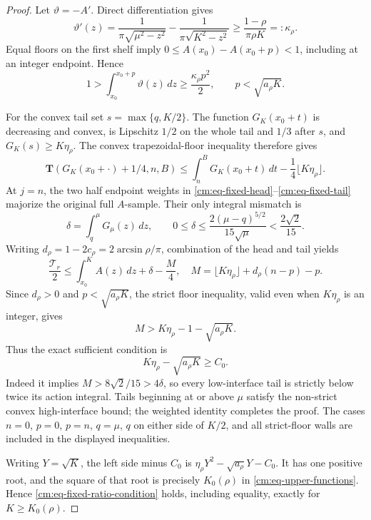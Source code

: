 \documentclass[11pt]{article}
\numberwithin{equation}{section}
\theoremstyle{definition}
\theoremstyle{remark}
\begin{document}
\begin{proof}
Let \(\vartheta=-A'\).  Direct differentiation gives
\[
 \vartheta'(z)=\frac1{\pi\sqrt{\mu^2-z^2}}
 -\frac1{\pi\sqrt{K^2-z^2}}
 \geq\frac{1-\rho}{\pi\rho K}=:\kappa_\rho.
\]
Equal floors on the first shelf imply
\(0\leq A(x_0)-A(x_0+p)<1\), including at an integer endpoint.  Hence
\[
 1>\int_{x_0}^{x_0+p}\vartheta(z)\,dz
 \geq\frac{\kappa_\rho p^2}{2},
 \qquad p<\sqrt{a_\rho K}.
\]

For the convex tail set \(s=\max\{q,K/2\}\).  The function
\(G_K(x_0+t)\) is decreasing and convex, is Lipschitz \(1/2\) on the
whole tail and \(1/3\) after \(s\), and
\(G_K(s)\geq K\eta_\rho\).  The convex trapezoidal-floor inequality
therefore gives
\begin{equation}
 \mathbf T(G_K(x_0+\cdot)+1/4,n,B)
 \leq\int_n^B G_K(x_0+t)\,dt
 -\frac14\lfloor K\eta_\rho\rfloor.
 \label{cm:eq-fixed-tail}
\end{equation}
At \(j=n\), the two half endpoint weights in
\eqref{cm:eq-fixed-head}--\eqref{cm:eq-fixed-tail} majorize the original
full \(A\)-sample.  Their only integral mismatch is
\[
 \delta=\int_q^\mu G_\mu(z)\,dz,
 \qquad 0\leq\delta\leq
 \frac{2(\mu-q)^{5/2}}{15\sqrt\mu}<\frac{2\sqrt2}{15}.
\]
Writing \(d_\rho=1-2c_\rho=2\arcsin\rho/\pi\), combination of the
head and tail yields
\[
 \frac{\mathcal T_r}{2}
 \leq\int_{x_0}^KA(z)\,dz+\delta-\frac M4,
 \quad
 M=\lfloor K\eta_\rho\rfloor+d_\rho(n-p)-p.
\]
Since \(d_\rho>0\) and \(p<\sqrt{a_\rho K}\), the strict floor
inequality, valid even when \(K\eta_\rho\) is an integer, gives
\[
 M>K\eta_\rho-1-\sqrt{a_\rho K}.
\]
Thus the exact sufficient condition is
\begin{equation}
 K\eta_\rho-\sqrt{a_\rho K}\geq C_0.
 \label{cm:eq-fixed-ratio-condition}
\end{equation}
Indeed it implies \(M>8\sqrt2/15>4\delta\), so every low-interface tail
is strictly below twice its action integral.  Tails beginning at or above
\(\mu\) satisfy the non-strict convex high-interface bound; the weighted
identity completes the proof.  The cases \(n=0\), \(p=0\), \(p=n\),
\(q=\mu\), \(q\) on either side of \(K/2\), and all strict-floor walls
are included in the displayed inequalities.

Writing \(Y=\sqrt K\), the left side minus \(C_0\) is
\(\eta_\rho Y^2-\sqrt{a_\rho}Y-C_0\).  It has one positive root, and
the square of that root is precisely \(K_0(\rho)\) in
\eqref{cm:eq-upper-functions}.  Hence \eqref{cm:eq-fixed-ratio-condition}
holds, including equality, exactly for \(K\geq K_0(\rho)\).


\end{proof}
\end{document}
